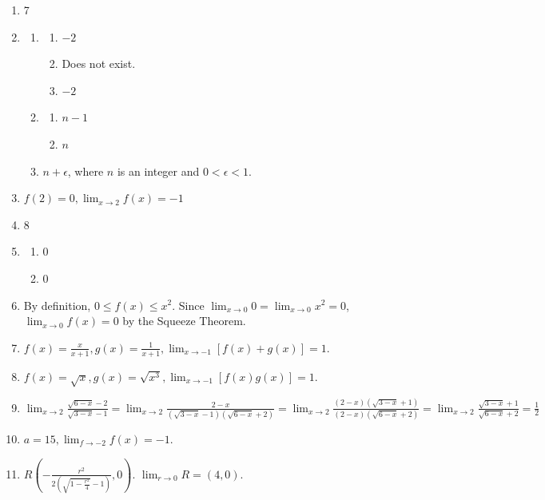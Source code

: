 \documentclass{article}
\begin{document}
\begin{enumerate}
\begin{enumerate}[label=(\alph*), start=2]
\begin{enumerate}[label=(\roman*)]
                  \item Does not exit.
                  \item 1
                \end{enumerate}
        \end{enumerate}
        \setcounter{enumi}{50}
  \item 7
        \setcounter{enumi}{52}
  \item \begin{enumerate}[label=(\alph*)]
          \item \begin{enumerate}[label=(\roman*)]
                  \item $-2$
                  \item Does not exist.
                  \item $-2$
                \end{enumerate}
          \item \begin{enumerate}[label=(\roman*)]
                  \item $n-1$
                  \item $n$
                \end{enumerate}
          \item $n+\epsilon$, where $n$ is an integer and $0 < \epsilon < 1$.
        \end{enumerate}
        \setcounter{enumi}{54}
  \item $f(2) = 0, \lim_{x\to2}f(x) = -1$
        \setcounter{enumi}{58}
  \item 8
  \item \begin{enumerate}[label=(\roman*)]
          \item 0
          \item 0
        \end{enumerate}
  \item By definition, $0 \le f(x) \le x^2$. Since $\lim_{x\to0}0 = \lim_{x\to0}x^2 = 0$,
        $\lim_{x\to0}f(x) = 0$ by the Squeeze Theorem.
  \item $f(x) = \frac{x}{x+1}, g(x) = \frac{1}{x+1}, \lim_{x\to-1}[f(x)+g(x)] = 1$.
  \item $f(x) = \sqrt{x}, g(x) = \sqrt{x^3}, \lim_{x\to-1}[f(x)g(x)] = 1$.
  \item $\lim_{x\to2}\frac{\sqrt{6-x}-2}{\sqrt{3-x}-1} =
          \lim_{x\to2}\frac{2-x}{(\sqrt{3-x}-1)(\sqrt{6-x}+2)} =
          \lim_{x\to2}\frac{(2-x)(\sqrt{3-x}+1)}{(2-x)(\sqrt{6-x}+2)} =
          \lim_{x\to2}\frac{\sqrt{3-x}+1}{\sqrt{6-x}+2} = \frac{1}{2}$
  \item $a=15, \lim_{f\to-2}f(x) = -1$.
  \item $R\left(-\frac{r^2}{2\left(\sqrt{1-\frac{r^2}{4}}-1\right)}, 0\right)$.
        $\lim_{r\to0}R = (4, 0)$.
\end{enumerate}
\end{document}

